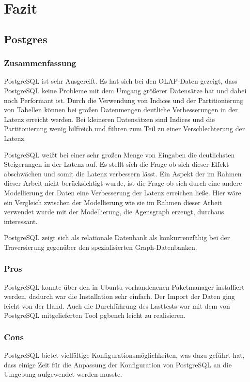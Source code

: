 \chapter{Fazit}
\section{Postgres}
\subsection{Zusammenfassung}
PostgreSQL ist sehr Ausgereift. Es hat sich bei den OLAP-Daten gezeigt, dass PostgreSQL keine Probleme mit dem Umgang größerer Datensätze hat und dabei noch Performant ist. Durch die Verwendung von Indices und der Partitionierung von Tabellen können bei großen Datenmengen deutliche Verbesserungen in der Latenz erreicht werden. Bei kleineren Datensätzen sind Indices und die Partitonierung wenig hilfreich und führen zum Teil zu einer Verschlechterung der Latenz.

PostgreSQL weißt bei einer sehr großen Menge von Eingaben die deutlichsten Steigerungen in der Latenz auf. Es stellt sich die Frage ob sich dieser Effekt abschwächen und somit die Latenz verbessern lässt.
Ein Aspekt der im Rahmen dieser Arbeit nicht berücksichtigt wurde, ist die Frage ob sich durch eine andere Modellierung der Daten eine Verbesserung der Latenz erreichen ließe. Hier wäre ein Vergleich zwischen der Modellierung wie sie im Rahmen dieser Arbeit verwendet wurde mit der Modellierung, die Agensgraph erzeugt, durchaus interessant. 

PostgreSQL zeigt sich als relationale Datenbank als konkurrenzfähig bei der Traversierung gegenüber den spezialisierten Graph-Datenbanken.

\subsection{Pros}
PostgreSQL konnte über den in Ubuntu vorhandenenen Paketmanager installiert werden, dadurch war die Installation sehr einfach. Der Import der Daten ging leicht von der Hand. Auch die Durchführung des Lasttests war mit dem von PostgreSQL mitgelieferten Tool pgbench leicht zu realisieren.  

\subsection{Cons}

PostgreSQL bietet vielfältige Konfigurationsmöglichkeiten, was dazu geführt hat, dass einige Zeit für die Anpassung der Konfiguration von PostgreSQL an die Umgebung aufgewendet werden musste.